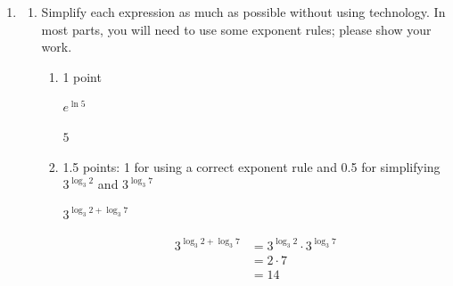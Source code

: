 \documentclass{article}
\begin{document}
\begin{enumerate}
\begin{enumerate}
    \begin{problem}[\nstretch{0.15}]
      What is $\displaystyle \lim_{x \rightarrow \infty} [3 - \log_2(x + 1)]$?
    \end{problem}

    \begin{solution}
      Based on our graph, 
      $\lim\limits_{x \to \infty} [3 - \log_2(x + 1)] = \boxed{-\infty}$.
    \end{solution}

  \end{enumerate} 

\item  \begin{enumerate}
  \item \label{simplify-exp-of-log-expressions-2}

    Simplify each expression as much as possible without using technology. In most parts, you will need to use some exponent rules; please show your work.

    \begin{enumerate}

    \item

      \begin{grading}
        1 point
      \end{grading}

      \begin{problem}[\stretch{0.5}]
        $\displaystyle e^{ \ln 5}$
      \end{problem}

      \begin{solution}
        $5$
      \end{solution}

    \item

      \begin{grading}
        1.5 points: 1 for using a correct exponent rule and 0.5 for
        simplifying $3^{\log_3 2}$ and $3^{\log_3 7}$
      \end{grading}

      \begin{problem}[\vfill]
        $3^{\log_3 2 + \log_3 7}$
      \end{problem}

      \begin{solution}
        \begin{align*}
          3^{\log_3 2 + \log_3 7} &= 3^{\log_3 2} \cdot 3^{\log_3 7} \\
          &= 2 \cdot 7 \\
          &= \boxed{14}
        \end{align*}
      \end{solution}


\end{enumerate}
\end{enumerate}
\end{enumerate}
\end{document}
